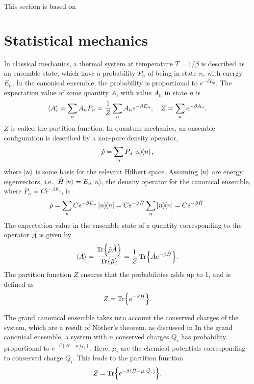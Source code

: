 This section is based on~

\section{Statistical mechanics}
\label{section:statistical mechanics}

In classical mechanics, a thermal system at temperature $T = 1 / \beta$ is described as an ensemble state, which have a probability $P_n$ of being in state $n$, with energy $E_n$.
In the canonical ensemble, the probability is proportional to $e^{-\beta E_n}$.
The expectation value of some quantity $A$, with value $A_n$ in state $n$ is
\begin{equation*}
    \left\langle A \right\rangle 
    = \sum_n A_n P_n = \frac{1}{Z} \sum_n A_n e^{- \beta E_n}, \quad 
    Z  = \sum_n e^{-\beta A_n}.
\end{equation*}
$Z$ is called the partition function. In quantum mechanics, an ensemble configuration is described by a non-pure density operator,
\begin{equation*}
    \hat \rho = \sum_n P_n \ketbra{n}{n},
\end{equation*}
where $\ket{n}$ is some basis for the relevant Hilbert space. Assuming $\ket{n}$ are energy eigenvectors, i.e., $\hat H \ket{n} = E_n \ket{n}$, the density operator for the canonical ensemble, where $P_n = Ce^{-\beta E_n}$, is
\begin{equation*}
    \hat \rho 
    = \sum_n C e^{-\beta E_n} \ketbra{n}{n} 
    = C e^{-\beta \hat H} \sum_n \ketbra{n}{n} 
    = C e^{-\beta \hat H}.
\end{equation*}
The expectation value in the ensemble state of a quantity corresponding to the operator $\hat A$ is given by
\begin{align}
    \left\langle A \right\rangle = \frac{ \Tr{\hat \rho \hat A} }{\Tr{\hat \rho }}
    = \frac{1}{Z} \Tr{\hat A e^{-\beta \hat H}}.
\end{align}
The partition function $Z$ ensures that the probabilities adds up to 1, and is defined as
\begin{equation}
    Z = \Tr{e^{-\beta \hat H}}.
\end{equation}

The grand canonical ensemble takes into account the conserved charges of the system, which are a result of Nöther's theorem, as discussed in 
In the grand canonical ensemble, a system with $n$ conserved charges $Q_i$ has probability proportional to $e^{-\beta (H - \mu_i Q_i)}$.
Here, $\mu_i$ are the chemical potentials corresponding to conserved charge $Q_i$.
This leads to the partition function
\begin{equation}
    Z = \Tr{e^{-\beta(\hat H - \mu_i \hat Q_i)}}.
\end{equation}




